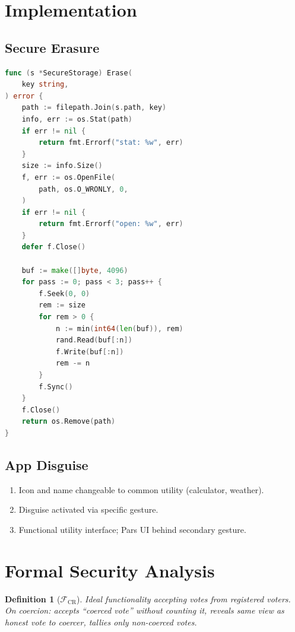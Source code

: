 \documentclass[11pt,a4paper]{article}
\newtheorem{definition}{Definition}[section]
\begin{document}
\section{Implementation}
\label{sec:implementation}

\subsection{Secure Erasure}

\begin{lstlisting}[language=Go,caption={Secure Erasure}]
func (s *SecureStorage) Erase(
    key string,
) error {
    path := filepath.Join(s.path, key)
    info, err := os.Stat(path)
    if err != nil {
        return fmt.Errorf("stat: %w", err)
    }
    size := info.Size()
    f, err := os.OpenFile(
        path, os.O_WRONLY, 0,
    )
    if err != nil {
        return fmt.Errorf("open: %w", err)
    }
    defer f.Close()

    buf := make([]byte, 4096)
    for pass := 0; pass < 3; pass++ {
        f.Seek(0, 0)
        rem := size
        for rem > 0 {
            n := min(int64(len(buf)), rem)
            rand.Read(buf[:n])
            f.Write(buf[:n])
            rem -= n
        }
        f.Sync()
    }
    f.Close()
    return os.Remove(path)
}
\end{lstlisting}

\subsection{App Disguise}

\begin{enumerate}
    \item Icon and name changeable to common utility (calculator, weather).
    \item Disguise activated via specific gesture.
    \item Functional utility interface; Pars UI behind secondary gesture.
\end{enumerate}

\section{Formal Security Analysis}
\label{sec:formal}

\begin{definition}[$\mathcal{F}_{\mathrm{CR}}$]
    Ideal functionality accepting votes from registered voters.  On
    coercion: accepts ``coerced vote'' without counting it, reveals same
    view as honest vote to coercer, tallies only non-coerced votes.
\end{definition}
\end{document}
